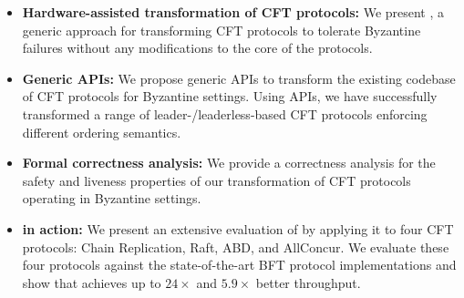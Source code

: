\begin{itemize}[leftmargin=*]
    \item {\bf Hardware-assisted transformation of CFT protocols:} We present \projecttitle{}, a generic approach for transforming CFT protocols to tolerate Byzantine failures without any modifications to the core of the protocols.%

    \item {\bf Generic \projecttitle{} APIs:} We propose generic \projecttitle{} APIs to transform the existing codebase of CFT protocols for Byzantine settings. Using \projecttitle{} APIs, we have successfully
transformed a range of leader-/leaderless-based CFT protocols enforcing different ordering semantics. %

    
    \item {\bf Formal correctness analysis:}  We provide a correctness analysis for the safety and liveness properties of our
transformation of CFT protocols operating in Byzantine settings. %
    \item {\bf \projecttitle{} in action:} We present an extensive evaluation of \projecttitle{} by applying it to four CFT protocols: Chain Replication, Raft, ABD, and AllConcur. We evaluate these four protocols against the state-of-the-art BFT protocol implementations and show that \projecttitle{} achieves up to $24\times$ and $5.9\times$ better throughput.
    
\end{itemize}
